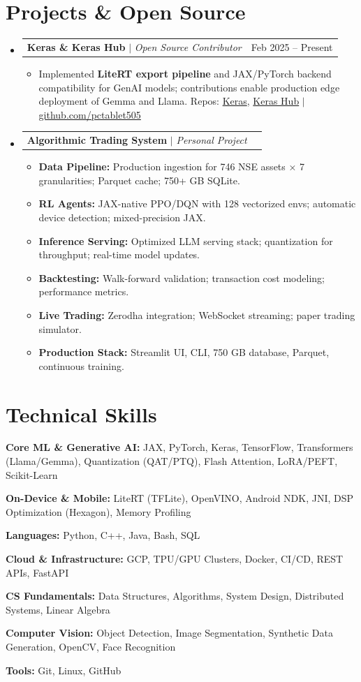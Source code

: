 \documentclass[10pt, letterpaper]{article}
\makeatletter
\newcommand{\resumeItem}[1]{
  \item\small{
    {#1 \vspace{-2pt}}
  }
}
\newcommand{\resumeProjectHeading}[2]{
    \item
    \begin{tabular*}{0.98\textwidth}{l@{\extracolsep{\fill}}r}
      \small#1 & #2 \\
    \end{tabular*}\vspace{-7pt}
}
\newcommand{\resumeSubHeadingListStart}{\begin{itemize}[leftmargin=0.15in, label={}]}
\newcommand{\resumeSubHeadingListEnd}{\end{itemize}}
\newcommand{\resumeItemListStart}{\begin{itemize}}
\newcommand{\resumeItemListEnd}{\end{itemize}\vspace{-5pt}}
\makeatother
\begin{document}
\section{Projects \& Open Source}
  \resumeSubHeadingListStart
    \resumeProjectHeading
      {\textbf{Keras \& Keras Hub} $|$ \emph{Open Source Contributor}}{Feb 2025 -- Present}
      \resumeItemListStart
        \resumeItem{Implemented \textbf{LiteRT export pipeline} and JAX/PyTorch backend compatibility for GenAI models; contributions enable production edge deployment of Gemma and Llama. Repos: \href{https://github.com/keras-team/keras}{Keras}, \href{https://github.com/keras-team/keras-hub}{Keras Hub} $|$ \href{https://github.com/pctablet505}{github.com/pctablet505}}
      \resumeItemListEnd
    \resumeProjectHeading
      {\textbf{Algorithmic Trading System} $|$ \emph{Personal Project}}{}
      \resumeItemListStart
        \resumeItem{\textbf{Data Pipeline:} Production ingestion for 746 NSE assets × 7 granularities; Parquet cache; 750+ GB SQLite.}
        \resumeItem{\textbf{RL Agents:} JAX-native PPO/DQN with 128 vectorized envs; automatic device detection; mixed-precision JAX.}
        \resumeItem{\textbf{Inference Serving:} Optimized LLM serving stack; quantization for throughput; real-time model updates.}
        \resumeItem{\textbf{Backtesting:} Walk-forward validation; transaction cost modeling; performance metrics.}
        \resumeItem{\textbf{Live Trading:} Zerodha integration; WebSocket streaming; paper trading simulator.}
        \resumeItem{\textbf{Production Stack:} Streamlit UI, CLI, 750 GB database, Parquet, continuous training.}
      \resumeItemListEnd
  \resumeSubHeadingListEnd

\section{Technical Skills}
 \begin{itemize}[leftmargin=0.12in, label={}]
    \small{\item{\textbf{Core ML \& Generative AI:} JAX, PyTorch, Keras, TensorFlow, Transformers (Llama/Gemma), Quantization (QAT/PTQ), Flash Attention, LoRA/PEFT, Scikit-Learn}}
    \small{\item{\textbf{On-Device \& Mobile:} LiteRT (TFLite), OpenVINO, Android NDK, JNI, DSP Optimization (Hexagon), Memory Profiling}}
    \small{\item{\textbf{Languages:} Python, C++, Java, Bash, SQL}}
    \small{\item{\textbf{Cloud \& Infrastructure:} GCP, TPU/GPU Clusters, Docker, CI/CD, REST APIs, FastAPI}}
    \small{\item{\textbf{CS Fundamentals:} Data Structures, Algorithms, System Design, Distributed Systems, Linear Algebra}}
    \small{\item{\textbf{Computer Vision:} Object Detection, Image Segmentation, Synthetic Data Generation, OpenCV, Face Recognition}}
    \small{\item{\textbf{Tools:} Git, Linux, GitHub}}
 \end{itemize}
\end{document}
